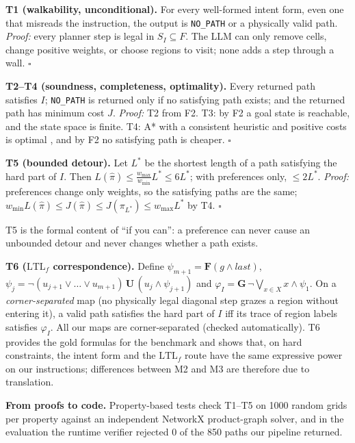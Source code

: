 \documentclass[letterpaper, 10 pt, conference]{ieeeconf}
\newcommand{\nopath}{\texttt{NO\_PATH}}
\newcommand{\Lt}{\mathrm{LTL}_f}
\begin{document}
\textbf{T1 (walkability, unconditional).} For every well-formed intent form, even one
that misreads the instruction, the output is \nopath{} or a physically valid path.
\emph{Proof:} every planner step is legal in $S_I\subseteq F$. The LLM can only remove
cells, change positive weights, or choose regions to visit; none adds a step through a
wall. \hfill$\square$

\textbf{T2--T4 (soundness, completeness, optimality).} Every returned path satisfies $I$;
\nopath{} is returned only if no satisfying path exists; and the returned path has
minimum cost $J$. \emph{Proof:} T2 from F2. T3: by F2 a goal state is reachable, and
the state space is finite. T4: A* with a consistent heuristic and positive costs is
optimal \cite{hart1968}, and by F2 no satisfying path is cheaper. \hfill$\square$

\textbf{T5 (bounded detour).} Let $L^*$ be the shortest length of a path satisfying
the hard part of $I$. Then
$L(\hat\pi) \le \tfrac{w_{\max}}{w_{\min}} L^* \le 6L^*$; with preferences only,
$\le 2L^*$. \emph{Proof:} preferences change only weights, so the satisfying paths are
the same; $w_{\min}L(\hat\pi) \le J(\hat\pi) \le J(\pi_{L^*}) \le w_{\max}L^*$ by
T4. \hfill$\square$

T5 is the formal content of ``if you can'': a preference can never cause an unbounded
detour and never changes whether a path exists.

\textbf{T6 ($\Lt$ correspondence).} Define
$\psi_{m+1} = \mathbf{F}(g \wedge \mathit{last})$,
$\psi_j = \neg(u_{j+1}\vee\dots\vee u_{m+1})\,\mathbf{U}\,(u_j \wedge \psi_{j+1})$ and
$\varphi_I = \mathbf{G}\,\neg\bigvee_{x\in X} x \wedge \psi_1$.
On a \emph{corner-separated} map (no physically legal diagonal step grazes a region
without entering it), a valid path satisfies the hard part of $I$ iff its trace of
region labels satisfies $\varphi_I$. All our maps are corner-separated (checked
automatically). T6 provides the gold formulas for the benchmark and shows that, on
hard constraints, the intent form and the $\Lt$ route have the same expressive power
on our instructions; differences between M2 and M3 are therefore due to translation.

\textbf{From proofs to code.} Property-based tests \cite{maciver2019hypothesis} check
T1--T5 on 1000 random grids per property against an independent NetworkX
\cite{hagberg2008} product-graph solver, and in the evaluation the runtime verifier
rejected 0 of the 850 paths our pipeline returned.

\end{document}
